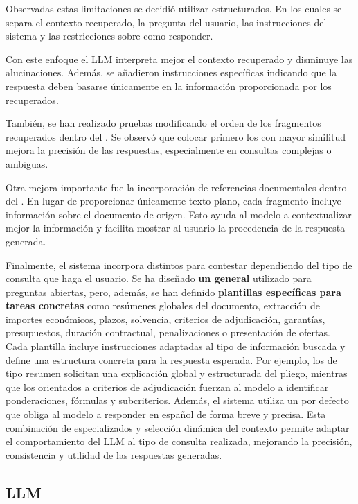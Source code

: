Observadas estas limitaciones se decidió utilizar  estructurados. En los cuales se separa el contexto recuperado, la pregunta del usuario, las instrucciones del sistema y las restricciones sobre como responder. 

Con este enfoque el LLM interpreta mejor el contexto recuperado y disminuye las alucinaciones. Además, se añadieron instrucciones específicas indicando que la respuesta deben basarse únicamente en la información proporcionada por los  recuperados.

También, se han realizado pruebas modificando el orden de los fragmentos recuperados dentro del . Se observó que colocar primero los  con mayor similitud mejora la precisión de las respuestas, especialmente en consultas complejas o ambiguas.

Otra mejora importante fue la incorporación de referencias documentales dentro del . En lugar de proporcionar únicamente texto plano, cada fragmento incluye información sobre el documento de origen. Esto ayuda al modelo a contextualizar mejor la información y facilita mostrar al usuario la procedencia de la respuesta generada.

Finalmente, el sistema incorpora distintos  para contestar dependiendo del tipo de consulta que haga el usuario. Se ha diseñado \textbf{un  general} utilizado para preguntas abiertas, pero, además, se han definido \textbf{plantillas específicas para tareas concretas} como resúmenes globales del documento, extracción de importes económicos, plazos, solvencia, criterios de adjudicación, garantías, presupuestos, duración contractual, penalizaciones o presentación de ofertas. Cada plantilla incluye instrucciones adaptadas al tipo de información buscada y define una estructura concreta para la respuesta esperada. Por ejemplo, los  de tipo resumen solicitan una explicación global y estructurada del pliego, mientras que los orientados a criterios de adjudicación fuerzan al modelo a identificar ponderaciones, fórmulas y subcriterios. Además, el sistema utiliza un  por defecto que obliga al modelo a responder en español de forma breve y precisa. Esta combinación de  especializados y selección dinámica del contexto permite adaptar el comportamiento del LLM al tipo de consulta realizada, mejorando la precisión, consistencia y utilidad de las respuestas generadas.

\subsection{LLM}

